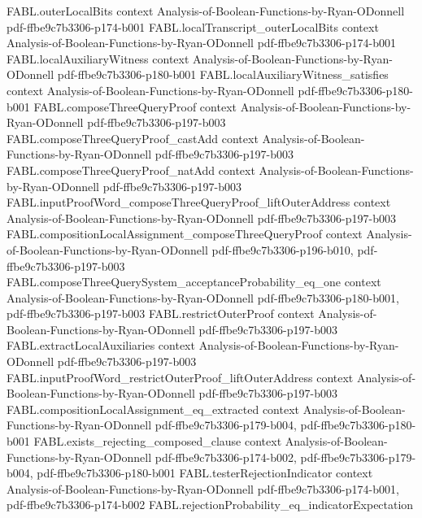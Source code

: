 \begin{theorem}
\proofstep
  {FABL.outerLocalBits}
  {context}
  {Analysis-of-Boolean-Functions-by-Ryan-ODonnell}
  {pdf-ffbe9c7b3306-p174-b001}
\proofstep
  {FABL.localTranscript_outerLocalBits}
  {context}
  {Analysis-of-Boolean-Functions-by-Ryan-ODonnell}
  {pdf-ffbe9c7b3306-p174-b001}
\proofstep
  {FABL.localAuxiliaryWitness}
  {context}
  {Analysis-of-Boolean-Functions-by-Ryan-ODonnell}
  {pdf-ffbe9c7b3306-p180-b001}
\proofstep
  {FABL.localAuxiliaryWitness_satisfies}
  {context}
  {Analysis-of-Boolean-Functions-by-Ryan-ODonnell}
  {pdf-ffbe9c7b3306-p180-b001}
\proofstep
  {FABL.composeThreeQueryProof}
  {context}
  {Analysis-of-Boolean-Functions-by-Ryan-ODonnell}
  {pdf-ffbe9c7b3306-p197-b003}
\proofstep
  {FABL.composeThreeQueryProof_castAdd}
  {context}
  {Analysis-of-Boolean-Functions-by-Ryan-ODonnell}
  {pdf-ffbe9c7b3306-p197-b003}
\proofstep
  {FABL.composeThreeQueryProof_natAdd}
  {context}
  {Analysis-of-Boolean-Functions-by-Ryan-ODonnell}
  {pdf-ffbe9c7b3306-p197-b003}
\proofstep
  {FABL.inputProofWord_composeThreeQueryProof_liftOuterAddress}
  {context}
  {Analysis-of-Boolean-Functions-by-Ryan-ODonnell}
  {pdf-ffbe9c7b3306-p197-b003}
\proofstep
  {FABL.compositionLocalAssignment_composeThreeQueryProof}
  {context}
  {Analysis-of-Boolean-Functions-by-Ryan-ODonnell}
  {pdf-ffbe9c7b3306-p196-b010,
    pdf-ffbe9c7b3306-p197-b003}
\proofstep
  {FABL.composeThreeQuerySystem_acceptanceProbability_eq_one}
  {context}
  {Analysis-of-Boolean-Functions-by-Ryan-ODonnell}
  {pdf-ffbe9c7b3306-p180-b001,
    pdf-ffbe9c7b3306-p197-b003}
\proofstep
  {FABL.restrictOuterProof}
  {context}
  {Analysis-of-Boolean-Functions-by-Ryan-ODonnell}
  {pdf-ffbe9c7b3306-p197-b003}
\proofstep
  {FABL.extractLocalAuxiliaries}
  {context}
  {Analysis-of-Boolean-Functions-by-Ryan-ODonnell}
  {pdf-ffbe9c7b3306-p197-b003}
\proofstep
  {FABL.inputProofWord_restrictOuterProof_liftOuterAddress}
  {context}
  {Analysis-of-Boolean-Functions-by-Ryan-ODonnell}
  {pdf-ffbe9c7b3306-p197-b003}
\proofstep
  {FABL.compositionLocalAssignment_eq_extracted}
  {context}
  {Analysis-of-Boolean-Functions-by-Ryan-ODonnell}
  {pdf-ffbe9c7b3306-p179-b004,
    pdf-ffbe9c7b3306-p180-b001}
\proofstep
  {FABL.exists_rejecting_composed_clause}
  {context}
  {Analysis-of-Boolean-Functions-by-Ryan-ODonnell}
  {pdf-ffbe9c7b3306-p174-b002,
    pdf-ffbe9c7b3306-p179-b004,
    pdf-ffbe9c7b3306-p180-b001}
\proofstep
  {FABL.testerRejectionIndicator}
  {context}
  {Analysis-of-Boolean-Functions-by-Ryan-ODonnell}
  {pdf-ffbe9c7b3306-p174-b001,
    pdf-ffbe9c7b3306-p174-b002}
\proofstep
  {FABL.rejectionProbability_eq_indicatorExpectation}

\end{theorem}
